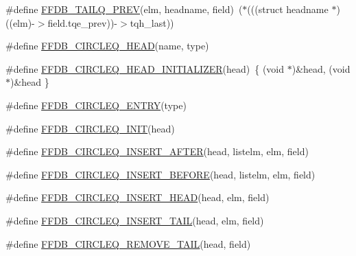 \begin{DoxyCompactItemize}
\item 
\#define \mbox{\hyperlink{adat-devel_2other__libs_2filedb_2filehash_2ffdb__cq_8h_a2678321bd4ede50f5ea96d441d91753e}{F\+F\+D\+B\+\_\+\+T\+A\+I\+L\+Q\+\_\+\+P\+R\+EV}}(elm,  headname,  field)~($\ast$(((struct headname $\ast$)((elm)-\/$>$field.\+tqe\+\_\+prev))-\/$>$tqh\+\_\+last))
\item 
\#define \mbox{\hyperlink{adat-devel_2other__libs_2filedb_2filehash_2ffdb__cq_8h_a49a3cb081b186b7fae0568ce30d68fa6}{F\+F\+D\+B\+\_\+\+C\+I\+R\+C\+L\+E\+Q\+\_\+\+H\+E\+AD}}(name,  type)
\item 
\#define \mbox{\hyperlink{adat-devel_2other__libs_2filedb_2filehash_2ffdb__cq_8h_a571e7bc1f6ccc5d83d8dd3060ed356c4}{F\+F\+D\+B\+\_\+\+C\+I\+R\+C\+L\+E\+Q\+\_\+\+H\+E\+A\+D\+\_\+\+I\+N\+I\+T\+I\+A\+L\+I\+Z\+ER}}(head)~\{ (void $\ast$)\&head, (void $\ast$)\&head \}
\item 
\#define \mbox{\hyperlink{adat-devel_2other__libs_2filedb_2filehash_2ffdb__cq_8h_a6c7c808085453506c051641493f1ee8e}{F\+F\+D\+B\+\_\+\+C\+I\+R\+C\+L\+E\+Q\+\_\+\+E\+N\+T\+RY}}(type)
\item 
\#define \mbox{\hyperlink{adat-devel_2other__libs_2filedb_2filehash_2ffdb__cq_8h_a255d87ec7c6c813e9c3d7988faac5ea3}{F\+F\+D\+B\+\_\+\+C\+I\+R\+C\+L\+E\+Q\+\_\+\+I\+N\+IT}}(head)
\item 
\#define \mbox{\hyperlink{adat-devel_2other__libs_2filedb_2filehash_2ffdb__cq_8h_a4acbb57d2b7a3d48afd629c5dc3ff4b1}{F\+F\+D\+B\+\_\+\+C\+I\+R\+C\+L\+E\+Q\+\_\+\+I\+N\+S\+E\+R\+T\+\_\+\+A\+F\+T\+ER}}(head,  listelm,  elm,  field)
\item 
\#define \mbox{\hyperlink{adat-devel_2other__libs_2filedb_2filehash_2ffdb__cq_8h_a4aba1eb8a28dd98ea80b231bb663f04f}{F\+F\+D\+B\+\_\+\+C\+I\+R\+C\+L\+E\+Q\+\_\+\+I\+N\+S\+E\+R\+T\+\_\+\+B\+E\+F\+O\+RE}}(head,  listelm,  elm,  field)
\item 
\#define \mbox{\hyperlink{adat-devel_2other__libs_2filedb_2filehash_2ffdb__cq_8h_a493ba20636fa52d99230f12bbd1d8e2a}{F\+F\+D\+B\+\_\+\+C\+I\+R\+C\+L\+E\+Q\+\_\+\+I\+N\+S\+E\+R\+T\+\_\+\+H\+E\+AD}}(head,  elm,  field)
\item 
\#define \mbox{\hyperlink{adat-devel_2other__libs_2filedb_2filehash_2ffdb__cq_8h_aa90ecf7f4e43f3e155bff708c46d6172}{F\+F\+D\+B\+\_\+\+C\+I\+R\+C\+L\+E\+Q\+\_\+\+I\+N\+S\+E\+R\+T\+\_\+\+T\+A\+IL}}(head,  elm,  field)
\item 
\#define \mbox{\hyperlink{adat-devel_2other__libs_2filedb_2filehash_2ffdb__cq_8h_a602c02bd10564a058d61203cb92d500c}{F\+F\+D\+B\+\_\+\+C\+I\+R\+C\+L\+E\+Q\+\_\+\+R\+E\+M\+O\+V\+E\+\_\+\+T\+A\+IL}}(head,  field)

\end{DoxyCompactItemize}
